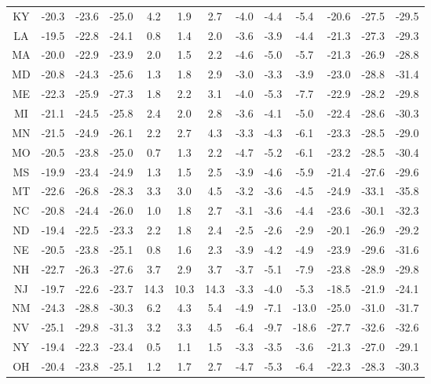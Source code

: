 \begin{table}
\begin{tabular}{ccccccccccccc}
   KY & -20.3 & -23.6 & -25.0 &  4.2 &  1.9 &  2.7 & -4.0 & -4.4 &  -5.4 & -20.6 & -27.5 & -29.5 \\
   LA & -19.5 & -22.8 & -24.1 &  0.8 &  1.4 &  2.0 & -3.6 & -3.9 &  -4.4 & -21.3 & -27.3 & -29.3 \\
   MA & -20.0 & -22.9 & -23.9 &  2.0 &  1.5 &  2.2 & -4.6 & -5.0 &  -5.7 & -21.3 & -26.9 & -28.8 \\
   MD & -20.8 & -24.3 & -25.6 &  1.3 &  1.8 &  2.9 & -3.0 & -3.3 &  -3.9 & -23.0 & -28.8 & -31.4 \\
   ME & -22.3 & -25.9 & -27.3 &  1.8 &  2.2 &  3.1 & -4.0 & -5.3 &  -7.7 & -22.9 & -28.2 & -29.8 \\
   MI & -21.1 & -24.5 & -25.8 &  2.4 &  2.0 &  2.8 & -3.6 & -4.1 &  -5.0 & -22.4 & -28.6 & -30.3 \\
   MN & -21.5 & -24.9 & -26.1 &  2.2 &  2.7 &  4.3 & -3.3 & -4.3 &  -6.1 & -23.3 & -28.5 & -29.0 \\
   MO & -20.5 & -23.8 & -25.0 &  0.7 &  1.3 &  2.2 & -4.7 & -5.2 &  -6.1 & -23.2 & -28.5 & -30.4 \\
   MS & -19.9 & -23.4 & -24.9 &  1.3 &  1.5 &  2.5 & -3.9 & -4.6 &  -5.9 & -21.4 & -27.6 & -29.6 \\
   MT & -22.6 & -26.8 & -28.3 &  3.3 &  3.0 &  4.5 & -3.2 & -3.6 &  -4.5 & -24.9 & -33.1 & -35.8 \\
   NC & -20.8 & -24.4 & -26.0 &  1.0 &  1.8 &  2.7 & -3.1 & -3.6 &  -4.4 & -23.6 & -30.1 & -32.3 \\
   ND & -19.4 & -22.5 & -23.3 &  2.2 &  1.8 &  2.4 & -2.5 & -2.6 &  -2.9 & -20.1 & -26.9 & -29.2 \\
   NE & -20.5 & -23.8 & -25.1 &  0.8 &  1.6 &  2.3 & -3.9 & -4.2 &  -4.9 & -23.9 & -29.6 & -31.6 \\
   NH & -22.7 & -26.3 & -27.6 &  3.7 &  2.9 &  3.7 & -3.7 & -5.1 &  -7.9 & -23.8 & -28.9 & -29.8 \\
   NJ & -19.7 & -22.6 & -23.7 & 14.3 & 10.3 & 14.3 & -3.3 & -4.0 &  -5.3 & -18.5 & -21.9 & -24.1 \\
   NM & -24.3 & -28.8 & -30.3 &  6.2 &  4.3 &  5.4 & -4.9 & -7.1 & -13.0 & -25.0 & -31.0 & -31.7 \\
   NV & -25.1 & -29.8 & -31.3 &  3.2 &  3.3 &  4.5 & -6.4 & -9.7 & -18.6 & -27.7 & -32.6 & -32.6 \\
   NY & -19.4 & -22.3 & -23.4 &  0.5 &  1.1 &  1.5 & -3.3 & -3.5 &  -3.6 & -21.3 & -27.0 & -29.1 \\
   OH & -20.4 & -23.8 & -25.1 &  1.2 &  1.7 &  2.7 & -4.7 & -5.3 &  -6.4 & -22.3 & -28.3 & -30.3 \\

\end{tabular}
\end{table}
